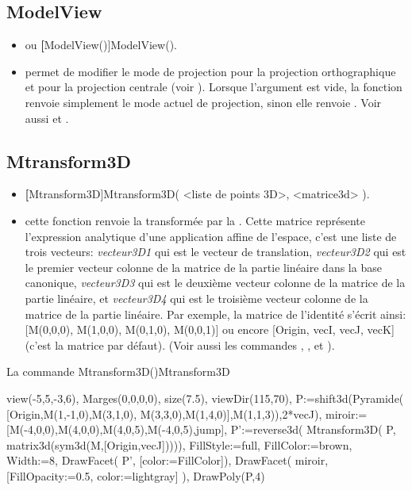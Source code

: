 \subsection{ModelView}\label{cmdModelView}
\begin{itemize}
 \item \util {} ou \textbf[ModelView()]{ModelView()}.
 \item \desc permet de modifier le mode de projection  pour la projection orthographique et  pour la projection centrale (voir ). Lorsque l'argument est vide, la fonction renvoie simplement le mode actuel de projection, sinon elle renvoie \Nil. Voir aussi  et .
\end{itemize}


\subsection{Mtransform3D}\label{cmdMtransform3D}
\begin{itemize}
 \item \util \textbf[Mtransform3D]{Mtransform3D( <liste de points 3D>, <matrice3d> )}.
 \item \desc cette fonction renvoie la  transformée par la . Cette matrice représente l'expression analytique d'une application affine de l'espace, c'est une liste de trois vecteurs: \textsl{vecteur3D1} qui est le vecteur de translation, \textsl{vecteur3D2} qui est le premier vecteur colonne de la matrice de la partie linéaire dans la base canonique, \textsl{vecteur3D3} qui est le deuxième vecteur colonne de la matrice de la partie linéaire, et \textsl{vecteur3D4} qui est le troisième vecteur colonne de la matrice de la partie linéaire. Par exemple, la matrice de l'identité s'écrit ainsi: [M(0,0,0), M(1,0,0), M(0,1,0), M(0,0,1)] ou encore [Origin, vecI, vecJ, vecK] (c'est la matrice par défaut). (Voir aussi les commandes , , et ).
\end{itemize}

\begin{demo}{La commande Mtransform3D()}{Mtransform3D}
\begin{texgraph}[name=Mtransform3D]
 view(-5,5,-3,6), Marges(0,0,0,0), size(7.5),
 viewDir(115,70),
 P:=shift3d(Pyramide( [Origin,M(1,-1,0),M(3,1,0),
        M(3,3,0),M(1,4,0)],M(1,1,3)),2*vecJ),
 miroir:=[M(-4,0,0),M(4,0,0),M(4,0,5),M(-4,0,5),jump],
 P':=reverse3d( Mtransform3D( P,
          matrix3d(sym3d(M,[Origin,vecJ])))),
 FillStyle:=full, FillColor:=brown, Width:=8,
 DrawFacet( P', [color:=FillColor]),
 DrawFacet( miroir,
        [FillOpacity:=0.5, color:=lightgray]
     ),
 DrawPoly(P,4) 
\end{texgraph}
\end{demo}


